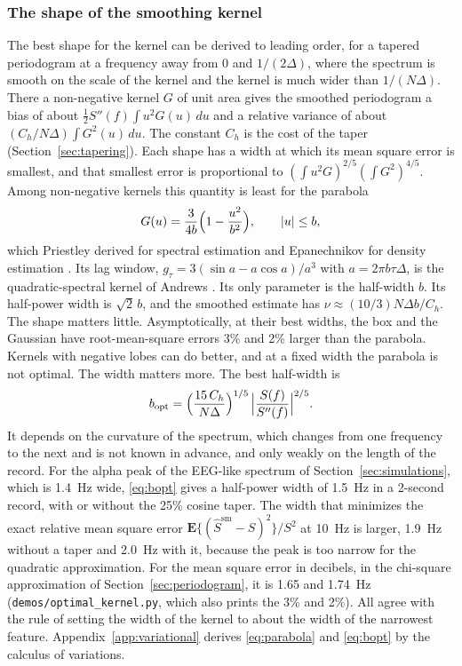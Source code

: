 \documentclass[10pt,twocolumn]{article}
\newcommand{\E}{\mathbf{E}}
\newcommand{\dd}{\,d}
\begin{document}
\subsubsection{The shape of the smoothing kernel}
\label{sec:shape}
The best shape for the kernel can be derived to leading order, for a tapered periodogram at a frequency away from 0 and $1/(2\Delta)$, where the spectrum is smooth on the scale of the kernel and the kernel is much wider than $1/(N\Delta)$. There a non-negative kernel $G$ of unit area gives the smoothed periodogram a bias of about $\tfrac12S''(f)\int u^2G(u)\dd u$ and a relative variance of about $(C_h/N\Delta)\int G^2(u)\dd u$. The constant $C_h$ is the cost of the taper (Section~\ref{sec:tapering}). Each shape has a width at which its mean square error is smallest, and that smallest error is proportional to $(\int u^2G)^{2/5}(\int G^2)^{4/5}$. Among non-negative kernels this quantity is least for the parabola
\begin{equation}
G(u)=\frac{3}{4b}\Bigl(1-\frac{u^2}{b^2}\Bigr),\qquad|u|\le b,
\label{eq:parabola}
\end{equation}
which Priestley derived for spectral estimation \cite{priestley1962} and Epanechnikov for density estimation \cite{epanechnikov1969}. Its lag window, $g_\tau=3(\sin a-a\cos a)/a^3$ with $a=2\pi b\tau\Delta$, is the quadratic-spectral kernel of Andrews \cite[Theorem~2]{andrews1991}. Its only parameter is the half-width $b$. Its half-power width is $\sqrt2\,b$, and the smoothed estimate has $\nu\approx(10/3)N\Delta b/C_h$. The shape matters little. Asymptotically, at their best widths, the box and the Gaussian have root-mean-square errors 3\% and 2\% larger than the parabola. Kernels with negative lobes can do better, and at a fixed width the parabola is not optimal. The width matters more. The best half-width is
\begin{equation}
b_{\mathrm{opt}}=\Bigl(\frac{15\,C_h}{N\Delta}\Bigr)^{1/5}\,\Bigl|\frac{S(f)}{S''(f)}\Bigr|^{2/5}.
\label{eq:bopt}
\end{equation}
It depends on the curvature of the spectrum, which changes from one frequency to the next and is not known in advance, and only weakly on the length of the record. For the alpha peak of the EEG-like spectrum of Section~\ref{sec:simulations}, which is 1.4~Hz wide, \eqref{eq:bopt} gives a half-power width of 1.5~Hz in a 2-second record, with or without the 25\% cosine taper. The width that minimizes the exact relative mean square error $\E\{(\hat S^{\mathrm{sm}}-S)^2\}/S^2$ at 10~Hz is larger, 1.9~Hz without a taper and 2.0~Hz with it, because the peak is too narrow for the quadratic approximation. For the mean square error in decibels, in the chi-square approximation of Section~\ref{sec:periodogram}, it is 1.65 and 1.74~Hz (\texttt{demos/optimal\_kernel.py}, which also prints the 3\% and 2\%). All agree with the rule of setting the width of the kernel to about the width of the narrowest feature. Appendix~\ref{app:variational} derives \eqref{eq:parabola} and \eqref{eq:bopt} by the calculus of variations.
\end{document}
